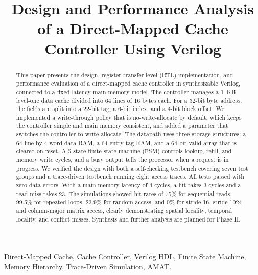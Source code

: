 \documentclass[conference]{IEEEtran}
\newcommand{\sig}[1]{\texttt{\detokenize{#1}}}
\begin{document}
\title{Design and Performance Analysis of a Direct-Mapped Cache Controller Using Verilog}

\author{
}

\maketitle

\begin{abstract}
This paper presents the design, register-transfer level (RTL) implementation, and performance evaluation of a direct-mapped cache controller in synthesizable Verilog, connected to a fixed-latency main-memory model. The controller manages a 1~KB level-one data cache divided into 64 lines of 16 bytes each. For a 32-bit byte address, the fields are split into a 22-bit tag, a 6-bit index, and a 4-bit block offset. We implemented a write-through policy that is no-write-allocate by default, which keeps the controller simple and main memory consistent, and added a \sig{WRITE_ALLOCATE} parameter that switches the controller to write-allocate. The datapath uses three storage structures: a 64-line by 4-word data RAM, a 64-entry tag RAM, and a 64-bit valid array that is cleared on reset. A 5-state finite-state machine (FSM) controls lookup, refill, and memory write cycles, and a busy output tells the processor when a request is in progress. We verified the design with both a self-checking testbench covering seven test groups and a trace-driven testbench running eight access traces. All tests passed with zero data errors. With a main-memory latency of 4 cycles, a hit takes 3 cycles and a read miss takes 23. The simulations showed hit rates of 75\% for sequential reads, 99.5\% for repeated loops, 23.9\% for random access, and 0\% for stride-16, stride-1024 and column-major matrix access, clearly demonstrating spatial locality, temporal locality, and conflict misses. Synthesis and further analysis are planned for Phase II.
\end{abstract}

\begin{IEEEkeywords}
Direct-Mapped Cache, Cache Controller, Verilog HDL, Finite State Machine, Memory Hierarchy, Trace-Driven Simulation, AMAT.
\end{IEEEkeywords}
\end{document}
